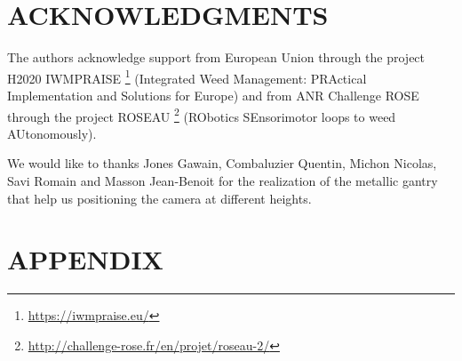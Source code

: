 \documentclass[a4paper,twoside]{article}
\begin{document}
	\section*{\uppercase{Acknowledgments}}
	
	\par The authors acknowledge support from European Union through the project H2020 IWMPRAISE \footnote{\url{https://iwmpraise.eu/}}
	(Integrated Weed Management: PRActical Implementation and Solutions for Europe)
	and from ANR Challenge ROSE through the project ROSEAU \footnote{\url{http://challenge-rose.fr/en/projet/roseau-2/}} (RObotics SEnsorimotor loops to weed AUtonomously).
	\\
	\par We would like to thanks Jones Gawain, Combaluzier Quentin, Michon Nicolas, Savi Romain and Masson Jean-Benoit
	for the realization of the metallic gantry that help us positioning the camera at different heights.
	
	
	
	
	
	\section*{\uppercase{Appendix}}

	\begin{table}[h]
		\centering
		\caption{list of algorithms with 3 modalities of their parameters}
		\label{tab:used-algorithms}
	\end{table}
	
\end{document}
